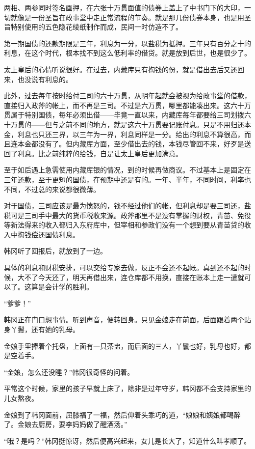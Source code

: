 两相、两参同时签名画押，在六张十万贯面值的债券上盖上了中书门下的大印，一切就像是一份圣旨在政事堂中走正常流程的节奏。就是那几份债券本身，也是用圣旨特别使用的五色隐花绫纸制作而成，民间一时仿造不了。

第一期国债的还款期限是三年，利息为一分，以盐税为抵押。三年只有百分之十的利息，在这个时代，根本找不到这么低利率的借贷。就是放到后世，也是很少了。

太上皇后的心情听说很好。在过去，内藏库只有掏钱的份，就是借出去后又还回来，也没说有利息的。

此外，过去每年按时给付三司的六十万贯，从明年起就会被视为给政事堂的借款，直接归入政斧的帐上，而不再是三司。不过是六万贯，哪里都能凑出来。这六十万贯属于特别国债，每年必须出借——毕竟一直以来，内藏库每年都要给三司划拨六十万贯的——但与之前不同的地方，就是这六十万贯要记账付息。只是不用归还本金，利息也只还三界，以三年为一界，利息同样是一分。给出的利息不算很高，而且连本金都没有了。但内藏库方面，至少借出去的钱，本钱尽管回不来，好歹是送回了利息。比之前纯粹的给钱，自是让太上皇后更加满意。

至于如后遇上急需使用内藏库银的情况，到的时候再做商议。不过基本上是固定在三年还款，至于更短的国债，在预期中还是有的。一年、半年，不同时间，利率也不同，不过总的来说都很微薄。

对于国债，三司应该是最为愤怒的，钱不经过他们的帐，但利息却是要三司还，盐税可是三司手中最大的货币税收来源。政斧那里不是没有掌握的财权，青苗、免役等新法得来的收入都归入东府库中，但宰相和参政们没有一个想到要从青苗贷的收入中掏钱偿还国债利息。

韩冈听了回报后，就放到了一边。

具体的利息和财税安排，可以交给专家去做，反正不会还不起帐。真到还不起的时候，大不了今天还了，明天再借出来，连仓库都不用换，直接在账本上走一遭就可以了。这算是会计学的胜利。

“爹爹！”

韩冈正在门口想事情。听到声音，便转回身。只见金娘走在前面，后面跟着两个贴身丫鬟，还有她的乳母。

金娘手里捧着个托盘，上面有一只茶盅，而后面的三人，丫鬟也好，乳母也好，都是空着手。

“金娘，怎么还没睡？”韩冈很奇怪的问着。

平常这个时候，家里的孩子早就上床了，除非是过年守岁，韩冈都不会支持家里的儿女熬夜。

金娘到了韩冈面前，屈膝福了一福，然后仰着头乖巧的道，“娘娘和姨娘都喝醉了。金娘去厨房，要李妈妈做了醒酒汤。”

“哦？是吗？”韩冈挺惊讶，然后便高兴起来，女儿是长大了，知道什么叫孝顺了。

